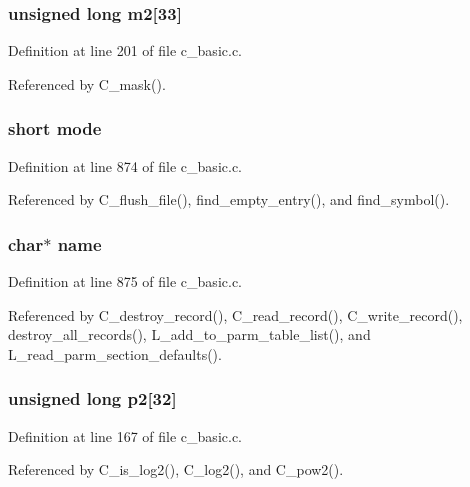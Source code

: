 \subsubsection{\setlength{\rightskip}{0pt plus 5cm}unsigned long \bf{m2}[33]\hspace{0.3cm}{\tt  [static]}}\label{c__basic_8c_ce49c1d63cf187f1c4450dff610cec79}




Definition at line 201 of file c\_\-basic.c.

Referenced by C\_\-mask().
\subsubsection{\setlength{\rightskip}{0pt plus 5cm}short \bf{mode}}\label{c__basic_8c_333c19a5aa15e91c469fe361186398d4}




Definition at line 874 of file c\_\-basic.c.

Referenced by C\_\-flush\_\-file(), find\_\-empty\_\-entry(), and find\_\-symbol().
\subsubsection{\setlength{\rightskip}{0pt plus 5cm}char$\ast$ \bf{name}}\label{c__basic_8c_5ac083a645d964373f022d03df4849c8}




Definition at line 875 of file c\_\-basic.c.

Referenced by C\_\-destroy\_\-record(), C\_\-read\_\-record(), C\_\-write\_\-record(), destroy\_\-all\_\-records(), L\_\-add\_\-to\_\-parm\_\-table\_\-list(), and L\_\-read\_\-parm\_\-section\_\-defaults().
\subsubsection{\setlength{\rightskip}{0pt plus 5cm}unsigned long \bf{p2}[32]\hspace{0.3cm}{\tt  [static]}}\label{c__basic_8c_007be3df3efb3ddf921d0f4e4678ebb9}




Definition at line 167 of file c\_\-basic.c.

Referenced by C\_\-is\_\-log2(), C\_\-log2(), and C\_\-pow2().
